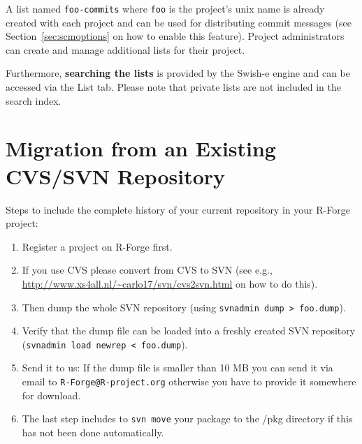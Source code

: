 \documentclass[a4paper]{article}
\let\code=\texttt
\let\email=\texttt
\newcommand{\proglang}[1]{\textsf{#1}}
\begin{document}
A list named \texttt{foo-commits} where \texttt{foo} is the
project's unix name is already created with each project and can be
used for distributing commit messages (see
Section~\ref{sec:scmoptions}  on how to enable
this feature). Project administrators can create and manage additional
lists for their project.  

Furthermore, \textbf{searching the lists} is provided by the Swish-e engine
and can be accessed via the List tab. Please note that private lists
are not included in the search index. 


\section{Migration from an Existing CVS/SVN Repository}
\label{sec:svnmigration}

Steps to include the complete history of your current repository in
your \proglang{R}-Forge project:

\begin{enumerate}
\item Register a project on \proglang{R}-Forge first.
\item If you use CVS please convert from CVS to SVN (see e.g.,
  \url{http://www.xs4all.nl/~carlo17/svn/cvs2svn.html} on how to do
  this).
\item Then dump the whole SVN repository (using \code{svnadmin dump >
    foo.dump}).
\item Verify that the dump file can be loaded into a freshly created
  SVN repository (\code{svnadmin load newrep < foo.dump}). 
\item Send it to us: If the dump file is smaller than 10 MB you can
  send it via email to \email{R-Forge@R-project.org} otherwise you have to
  provide it somewhere for download. 
\item The last step includes to \code{svn move} your package
  to the /pkg directory if this has not been done automatically.
\end{enumerate}
\end{document}
